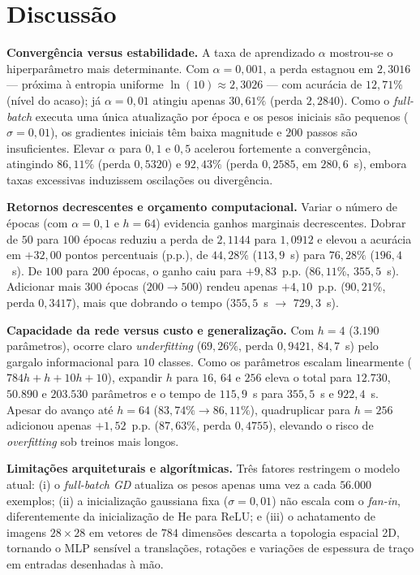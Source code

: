 \section{Discussão}

\textbf{Convergência versus estabilidade.} A taxa de aprendizado $\alpha$ mostrou-se o hiperparâmetro mais determinante. Com $\alpha = 0{,}001$, a perda estagnou em $2{,}3016$ --- próxima à entropia uniforme $\ln(10) \approx 2{,}3026$ --- com acurácia de $12{,}71\%$ (nível do acaso); já $\alpha = 0{,}01$ atingiu apenas $30{,}61\%$ (perda $2{,}2840$). Como o \textit{full-batch} executa uma única atualização por época e os pesos iniciais são pequenos ($\sigma = 0{,}01$), os gradientes iniciais têm baixa magnitude e $200$ passos são insuficientes. Elevar $\alpha$ para $0{,}1$ e $0{,}5$ acelerou fortemente a convergência, atingindo $86{,}11\%$ (perda $0{,}5320$) e $92{,}43\%$ (perda $0{,}2585$, em $280{,}6$~s), embora taxas excessivas induzissem oscilações ou divergência.

\textbf{Retornos decrescentes e orçamento computacional.} Variar o número de épocas (com $\alpha = 0{,}1$ e $h = 64$) evidencia ganhos marginais decrescentes. Dobrar de $50$ para $100$ épocas reduziu a perda de $2{,}1144$ para $1{,}0912$ e elevou a acurácia em $+32{,}00$ pontos percentuais (p.p.), de $44{,}28\%$ ($113{,}9$~s) para $76{,}28\%$ ($196{,}4$~s). De $100$ para $200$ épocas, o ganho caiu para $+9{,}83$~p.p. ($86{,}11\%$, $355{,}5$~s). Adicionar mais $300$ épocas ($200 \to 500$) rendeu apenas $+4{,}10$~p.p. ($90{,}21\%$, perda $0{,}3417$), mais que dobrando o tempo ($355{,}5$~s $\to$ $729{,}3$~s).

\textbf{Capacidade da rede versus custo e generalização.} Com $h = 4$ ($3.190$ parâmetros), ocorre claro \textit{underfitting} ($69{,}26\%$, perda $0{,}9421$, $84{,}7$~s) pelo gargalo informacional para $10$ classes. Como os parâmetros escalam linearmente ($784h + h + 10h + 10$), expandir $h$ para $16$, $64$ e $256$ eleva o total para $12.730$, $50.890$ e $203.530$ parâmetros e o tempo de $115{,}9$~s para $355{,}5$~s e $922{,}4$~s. Apesar do avanço até $h = 64$ ($83{,}74\% \to 86{,}11\%$), quadruplicar para $h = 256$ adicionou apenas $+1{,}52$~p.p. ($87{,}63\%$, perda $0{,}4755$), elevando o risco de \textit{overfitting} sob treinos mais longos.

\textbf{Limitações arquiteturais e algorítmicas.} Três fatores restringem o modelo atual: (i) o \textit{full-batch GD} atualiza os pesos apenas uma vez a cada $56.000$ exemplos; (ii) a inicialização gaussiana fixa ($\sigma = 0{,}01$) não escala com o \textit{fan-in}, diferentemente da inicialização de He para ReLU; e (iii) o achatamento de imagens $28 \times 28$ em vetores de $784$ dimensões descarta a topologia espacial 2D, tornando o MLP sensível a translações, rotações e variações de espessura de traço em entradas desenhadas à mão.

